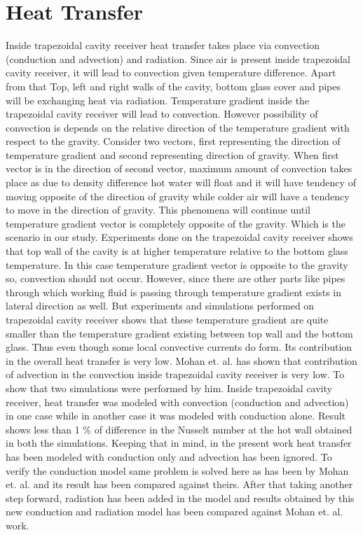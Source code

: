 \chapter{Heat Transfer}\label{ch_Heat_Transfer}
Inside trapezoidal cavity receiver heat transfer takes place via convection (conduction and advection) and radiation. Since air is present inside trapezoidal cavity receiver, it will lead to convection given temperature difference. Apart from that Top, left and right walls of the cavity, bottom glass cover and pipes will be exchanging heat via radiation. Temperature gradient inside the trapezoidal cavity receiver will lead to convection. However possibility of convection is depends on the relative direction of the temperature gradient with respect to the gravity.  Consider two vectors, first representing the direction of temperature gradient and second representing direction of gravity. When first vector is in the direction of second vector, maximum amount of convection takes place as due to density difference hot water will float and it will have tendency of moving opposite of the direction of gravity while colder air will have a tendency to move in the direction of gravity. This phenomena will continue until temperature gradient vector is completely opposite of the gravity. Which is the scenario in our study. Experiments done on the trapezoidal cavity receiver shows that top wall of the cavity is at higher temperature relative to the bottom glass temperature. In this case temperature gradient vector is opposite to the gravity so, convection should not occur. However, since there are other parts like pipes through which working fluid is passing through temperature gradient exists in lateral direction as well. But experiments and simulations performed on trapezoidal cavity receiver shows that these temperature gradient are quite smaller than the temperature gradient existing between top wall and the bottom glass. Thus even though some local convective currents do form. Its contribution in the overall heat transfer is very low. Mohan et. al.\citep{MOHAN201837} has shown that contribution of advection in the convection inside trapezoidal cavity receiver is very low. To show that two simulations were performed by him. Inside trapezoidal cavity receiver, heat transfer was modeled with convection (conduction and advection) in one case while in another case it was modeled with conduction alone. Result shows less than 1 \% of difference in the Nusselt number at the hot wall obtained in both the simulations. Keeping that in mind, in the present work heat transfer has been modeled with conduction only and advection has been ignored. To verify the conduction model same problem is solved here as has been by Mohan et. al.\citep{MOHAN201837} and its result has been compared against theirs. After that taking another step forward, radiation has been added in the model and results obtained by this new conduction and radiation model has been compared against Mohan et. al.\citep{MOHAN201837} work. 



